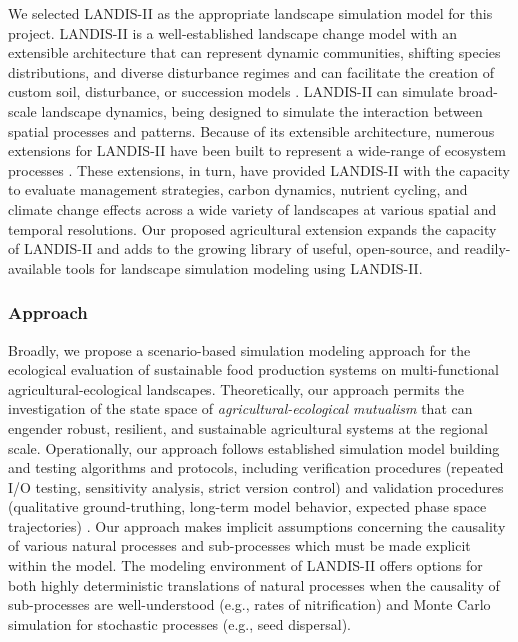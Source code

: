 \documentclass[12pt, letterpaper]{article}
\begin{document}
We selected LANDIS-II as the appropriate landscape simulation model for this project. LANDIS-II is a well-established landscape change model with an extensible architecture that can represent dynamic communities, shifting species distributions, and diverse disturbance regimes and can facilitate the creation of custom soil, disturbance, or succession models \citep{scheller_design_2007}. LANDIS-II can simulate broad-scale landscape dynamics, being designed to simulate the interaction between spatial processes and patterns. Because of its extensible architecture, numerous extensions for LANDIS-II have been built to represent a wide-range of ecosystem processes \citep{LANDISII_2017}. These extensions, in turn, have provided LANDIS-II with the capacity to evaluate management strategies, carbon dynamics, nutrient cycling, and climate change effects across a wide variety of landscapes at various spatial and temporal resolutions. Our proposed agricultural extension expands the capacity of LANDIS-II and adds to the growing library of useful, open-source, and readily-available tools for landscape simulation modeling using LANDIS-II.

\subsubsection*{Approach}
Broadly, we propose a scenario-based simulation modeling approach for the ecological evaluation of sustainable food production systems on multi-functional agricultural-ecological landscapes. Theoretically, our approach permits the investigation of the state space of \textit{agricultural-ecological mutualism} that can engender robust, resilient, and sustainable agricultural systems at the regional scale. Operationally, our approach follows established simulation model building and testing algorithms and protocols, including verification procedures (repeated I/O testing, sensitivity analysis, strict version control) and validation procedures (qualitative ground-truthing, long-term model behavior, expected phase space trajectories) \citep{law_simulation_2006, haefner_modeling_2005, scheller_forest_2004}. Our approach makes implicit assumptions concerning the causality of various natural processes and sub-processes which must be made explicit within the model. The modeling environment of LANDIS-II offers options for both highly deterministic translations of natural processes when the causality of sub-processes are well-understood (e.g., rates of nitrification) and Monte Carlo simulation for stochastic processes (e.g., seed dispersal).
\end{document}
